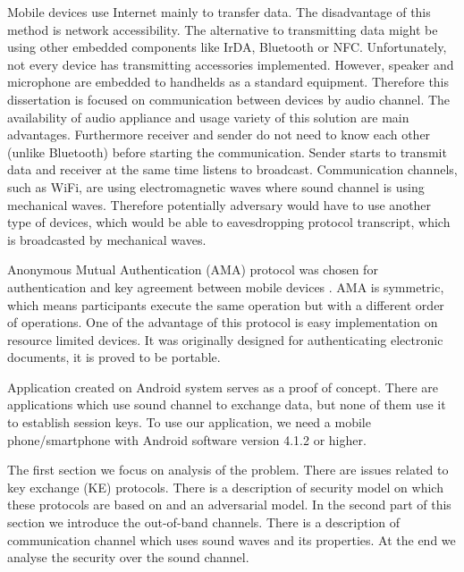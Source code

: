 \documentclass[11pt,titlepage]{article}
\theoremstyle{plain}
\begin{document}
Mobile devices use Internet mainly to transfer data. The disadvantage of this method is network accessibility. The alternative to transmitting data might be using other embedded components like IrDA, Bluetooth or NFC. Unfortunately, not every device has transmitting accessories implemented. However,  speaker and microphone are embedded to handhelds as a standard equipment. Therefore this dissertation is focused on communication between devices by audio channel. The availability of audio appliance and usage variety of this solution are main advantages. Furthermore receiver and sender do not need to know each other (unlike Bluetooth) before starting the communication. Sender starts to transmit data and receiver at the same time listens to broadcast. Communication channels, such as WiFi, are using electromagnetic waves where sound channel is using mechanical waves. Therefore potentially adversary would have to use another type of devices, which would be able to eavesdropping protocol transcript, which is broadcasted by mechanical waves.

\vspace{5mm}

Anonymous Mutual Authentication (AMA) protocol was chosen for authentication and key agreement between mobile devices \cite{AMA}. AMA is symmetric, which means  participants execute the same operation but with a different order of operations. One of the advantage of this protocol is easy implementation on resource limited devices. It was originally designed for authenticating electronic documents, it is proved to be portable.

\vspace{5mm}

Application created on Android system serves as a proof of concept. There are applications which use sound channel to exchange data, but none of them use it to establish session keys. To use our application, we need a mobile phone/smartphone with Android software version 4.1.2 or higher.

\vspace{5mm}

The first section we focus on analysis of the problem. There are issues related to key exchange (KE) protocols. There is a description of security model on which these protocols are based on and an adversarial model. In the second part of this section we introduce the out-of-band channels. There is a description of communication channel which uses sound waves and its properties. At the end we analyse the security over the sound channel. 
\end{document}
